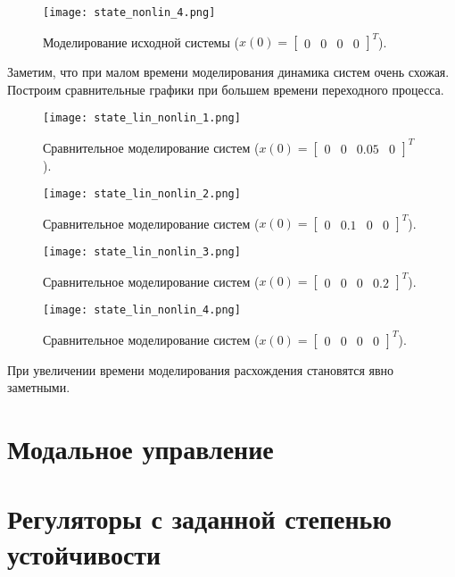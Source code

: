\begin{figure}[]
    \centering
    \texttt{[image: state\_nonlin\_4.png]}
    \caption{\label{fig:task2_4_4}Моделирование исходной системы ($x(0)=\begin{bmatrix}
        0 & 0 & 0 & 0
    \end{bmatrix}^T$).}
\end{figure}
\pagebreak
Заметим, что при малом времени моделирования динамика систем очень схожая. Построим сравнительные графики при большем времени переходного процесса.

\begin{figure}[]
    \centering
    \texttt{[image: state\_lin\_nonlin\_1.png]}
    \caption{\label{fig:task2_4_5}Сравнительное моделирование систем ($x(0)=\begin{bmatrix}
        0 & 0 & 0.05 & 0
    \end{bmatrix}^T$).}
\end{figure}

\begin{figure}[]
    \centering
    \texttt{[image: state\_lin\_nonlin\_2.png]}
    \caption{\label{fig:task2_4_6}Сравнительное моделирование систем ($x(0)=\begin{bmatrix}
        0 & 0.1 & 0 & 0
    \end{bmatrix}^T$).}
\end{figure}

\begin{figure}[]
    \centering
    \texttt{[image: state\_lin\_nonlin\_3.png]}
    \caption{\label{fig:task2_4_7}Сравнительное моделирование систем ($x(0)=\begin{bmatrix}
        0 & 0 & 0 & 0.2
    \end{bmatrix}^T$).}
\end{figure}

\begin{figure}[]
    \centering
    \texttt{[image: state\_lin\_nonlin\_4.png]}
    \caption{\label{fig:task2_4_8}Сравнительное моделирование систем ($x(0)=\begin{bmatrix}
        0 & 0 & 0 & 0
    \end{bmatrix}^T$).}
\end{figure}

\pagebreak
При увеличении времени моделирования расхождения становятся явно заметными.

\section{Модальное управление}
\pagebreak

\section{Регуляторы с заданной степенью устойчивости}